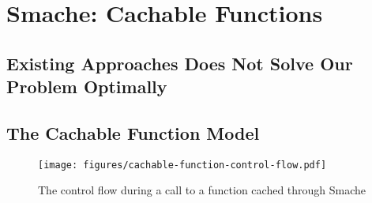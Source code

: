 \chapter{Smache: Cachable Functions}
\label{chapter:smache-cachable-functions}



\section{Existing Approaches Does Not Solve Our Problem Optimally}
\label{sec:existing_approaches_does_not_solve_our_problem_optimally}




\section{The Cachable Function Model}
\label{sec:the_cachable_function_model}


\begin{figure*}[ht!]
  \centering
  \texttt{[image: figures/cachable-function-control-flow.pdf]}
  \caption{The control flow during a call to a function cached through Smache}
  \label{fig:cachable-function-control-flow}
\end{figure*}


